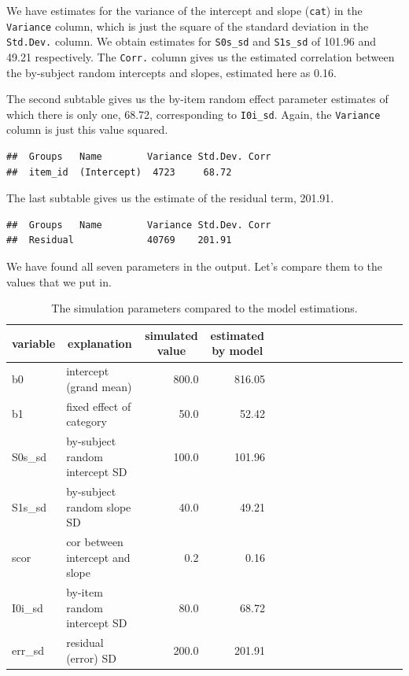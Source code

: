 \documentclass[man,floatsintext]{apa6}
\begin{document}
We have estimates for the variance of the intercept and slope (\texttt{cat}) in the \texttt{Variance} column, which is just the square of the standard deviation in the \texttt{Std.Dev.} column. We obtain estimates for \texttt{S0s\_sd} and \texttt{S1s\_sd} of 101.96 and 49.21 respectively. The \texttt{Corr.} column gives us the estimated correlation between the by-subject random intercepts and slopes, estimated here as 0.16.

The second subtable gives us the by-item random effect parameter estimates of which there is only one, 68.72, corresponding to \texttt{I0i\_sd}. Again, the \texttt{Variance} column is just this value squared.

\begin{verbatim}
##  Groups   Name        Variance Std.Dev. Corr
##  item_id  (Intercept)  4723     68.72
\end{verbatim}

The last subtable gives us the estimate of the residual term, 201.91.

\begin{verbatim}
##  Groups   Name        Variance Std.Dev. Corr
##  Residual             40769    201.91
\end{verbatim}

We have found all seven parameters in the output. Let's compare them to the values that we put in.

\begin{table}[H]
\begin{center}
\begin{threeparttable}
\caption{\label{tab:param-compare}The simulation parameters compared to the model estimations.}
\begin{tabular}{llrrllrrllrrllrr}
\toprule
variable & \multicolumn{1}{c}{explanation} & \multicolumn{1}{c}{simulated value} & \multicolumn{1}{c}{estimated by model}\\
\midrule
b0 & intercept (grand mean) & 800.0 & 816.05\\
b1 & fixed effect of category & 50.0 & 52.42\\
S0s\_sd & by-subject random intercept SD & 100.0 & 101.96\\
S1s\_sd & by-subject random slope SD & 40.0 & 49.21\\
scor & cor between intercept and slope & 0.2 & 0.16\\
I0i\_sd & by-item random intercept SD & 80.0 & 68.72\\
err\_sd & residual (error) SD & 200.0 & 201.91\\
\bottomrule
\end{tabular}
\end{threeparttable}
\end{center}
\end{table}
\end{document}
